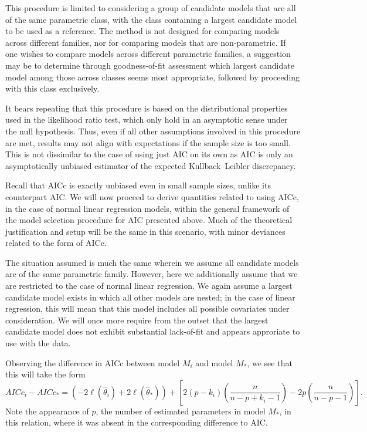 		This procedure is limited to considering a group of candidate models that are all of the same parametric class, with the class containing a largest candidate
		model to be used as a reference. The method is not designed for comparing models across different families, nor for comparing models that are non-parametric.
		If one wishes to compare models across different parametric families, a suggestion may be to determine through goodness-of-fit assessment which largest candidate model
		among those across classes seems most appropriate, followed by proceeding with this class exclusively.

		It bears repeating that this procedure is based on the distributional properties used in the likelihood ratio test, which only hold in an asymptotic sense under the
		null hypothesis. Thus, even if all other assumptions involved in this procedure are met, results may not align with expectations if the sample size is too small. This is not
		dissimilar to the case of using just AIC on its own as AIC is only an asymptotically unbiased estimator of the expected Kullback–Leibler discrepancy.

		Recall that AICc is exactly unbiased even in small sample sizes, unlike its counterpart AIC. We will now proceed to derive quantities related to using AICc,
		in the case of normal linear regression models, within the general framework of the model selection procedure for AIC presented above. Much of the theoretical
		justification and setup will be the same in this scenario, with minor deviances related to the form of AICc.

		The situation assumed is much the same wherein we assume all candidate models are of the same parametric family. However, here we additionally assume that we are
		restricted to the case of normal linear regression. We again assume a largest candidate model exists in which all other models are nested; in the case of linear
		regression, this will mean that this model includes all possible covariates under consideration. We will once more require from the outset that the largest candidate
		model does not exhibit substantial lack-of-fit and appears approriate to use with the data.

		Observing the difference in AICc between model $M_i$ and model $M_*$, we see that
		this will take the form
		\begin{equation}
			AICc_i - AICc_* = (-2 \ell (\hat{\theta}_i) + 2 \ell (\hat{\theta}_*) ) + \left[ 2(p-k_i) \left( \frac{n}{n-p+k_i-1} \right) - 2p \left( \frac{n}{n-p-1} \right) \right] .
		\end{equation}
		Note the appearance of $p$, the number of estimated parameters in model $M_*$, in this relation, where it was absent in the corresponding difference to AIC.

